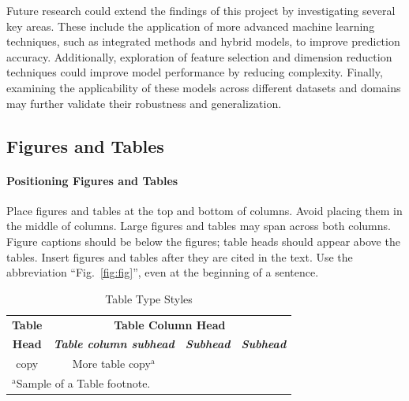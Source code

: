 \documentclass[conference]{IEEEtran}
\begin{document}
Future research could extend the findings of this project by investigating several key areas. These include the application of more advanced machine learning techniques, such as integrated methods and hybrid models, to improve prediction accuracy. Additionally, exploration of feature selection and dimension reduction techniques could improve model performance by reducing complexity. Finally, examining the applicability of these models across different datasets and domains may further validate their robustness and generalization.























\subsection{Figures and Tables}\label{FAT}
\paragraph{Positioning Figures and Tables} Place figures and tables at the top and
bottom of columns. Avoid placing them in the middle of columns. Large
figures and tables may span across both columns. Figure captions should be
below the figures; table heads should appear above the tables. Insert
figures and tables after they are cited in the text. Use the abbreviation
``Fig.~\ref{fig:fig}'', even at the beginning of a sentence.

\begin{table}[htbp]
\caption{Table Type Styles}
\begin{center}
\begin{tabular}{|c|c|c|c|}
\hline
\textbf{Table}&\multicolumn{3}{|c|}{\textbf{Table Column Head}} \\
\cline{2-4}
\textbf{Head} & \textbf{\textit{Table column subhead}}& \textbf{\textit{Subhead}}& \textbf{\textit{Subhead}} \\
\hline
copy& More table copy$^{\mathrm{a}}$& &  \\
\hline
\multicolumn{4}{l}{$^{\mathrm{a}}$Sample of a Table footnote.}
\end{tabular}
\label{tab1}
\end{center}
\end{table}
\end{document}
